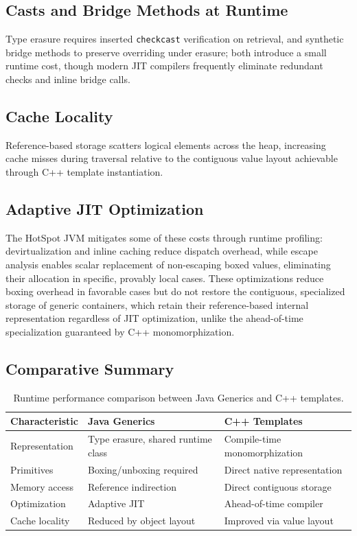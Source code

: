 \documentclass[11pt]{report}
\begin{document}
\subsection{Casts and Bridge Methods at Runtime}

Type erasure requires inserted \texttt{checkcast} verification on
retrieval, and synthetic bridge methods to preserve overriding under
erasure; both introduce a small runtime cost, though modern JIT compilers
frequently eliminate redundant checks and inline bridge calls.

\subsection{Cache Locality}

Reference-based storage scatters logical elements across the heap,
increasing cache misses during traversal relative to the contiguous value
layout achievable through C++ template instantiation.

\subsection{Adaptive JIT Optimization}
\label{JavaGenerics:Performance:Optimization}

The HotSpot JVM mitigates some of these costs through runtime profiling:
devirtualization and inline caching reduce dispatch overhead, while escape
analysis enables scalar replacement of non-escaping boxed values,
eliminating their allocation in specific, provably local cases. These
optimizations reduce boxing overhead in favorable cases but do not restore
the contiguous, specialized storage of generic containers, which retain
their reference-based internal representation regardless of JIT
optimization, unlike the ahead-of-time specialization guaranteed by C++
monomorphization.

\subsection{Comparative Summary}

\begin{table}[h]
\centering
\begin{tabular}{|p{4cm}|p{5cm}|p{5cm}|}
\hline
\textbf{Characteristic} & \textbf{Java Generics} & \textbf{C++ Templates} \\
\hline
Representation & Type erasure, shared runtime class & Compile-time monomorphization \\
\hline
Primitives & Boxing/unboxing required & Direct native representation \\
\hline
Memory access & Reference indirection & Direct contiguous storage \\
\hline
Optimization & Adaptive JIT & Ahead-of-time compiler \\
\hline
Cache locality & Reduced by object layout & Improved via value layout \\
\hline
\end{tabular}
\caption{Runtime performance comparison between Java Generics and C++ templates.}
\end{table}
\end{document}

